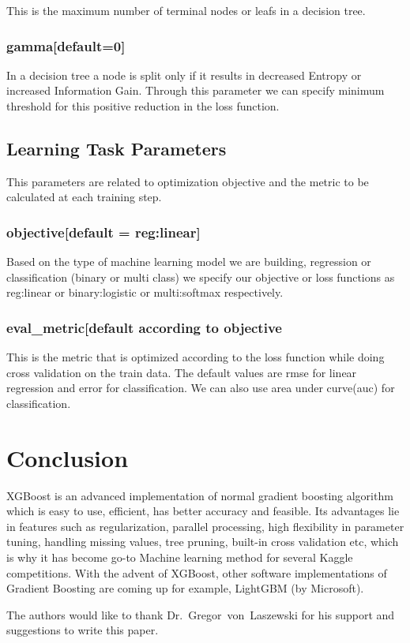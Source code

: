 This is the maximum number of terminal nodes or leafs in a decision tree.

\subsubsection{gamma[default=0]} 

In a decision tree a node is split only if it results in decreased Entropy or increased 
Information Gain. Through this parameter  we can specify minimum threshold for this positive 
reduction in the loss function.

\subsection{Learning Task Parameters} 

This parameters are related to optimization objective and the metric to be calculated at
each training step.

\subsubsection{objective[default = reg:linear]}

Based on the type of machine learning model we are building, regression or classification
(binary or multi class) we specify our objective or loss functions as reg:linear or
binary:logistic or  multi:softmax respectively.

\subsubsection{eval\_metric[default according to objective}

This is the metric that is optimized according to the loss function while doing cross 
validation on the train data. The default values are rmse for linear regression and  error 
for classification. We can also use area under curve(auc) for classification.

 

\section{Conclusion} 

 XGBoost is an advanced implementation of normal gradient boosting algorithm which is
 easy to use, efficient, has better accuracy and feasible. Its advantages lie in features  
 such as regularization, parallel processing, high flexibility in parameter tuning, handling 
 missing values, tree pruning, built-in cross validation etc, which is why it has become go-to
 Machine learning method for several Kaggle competitions. With the advent of XGBoost, other 
 software implementations of Gradient Boosting are coming up for example, LightGBM (by 
 Microsoft).

\begin{acks}

  The authors would like to thank Dr.~Gregor~von~Laszewski for his
  support and suggestions to write this paper.

\end{acks}


 

